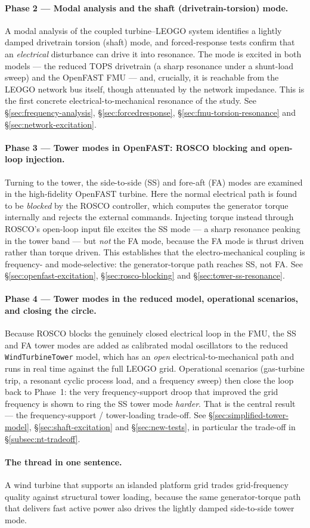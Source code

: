 \paragraph{Phase 2 --- Modal analysis and the shaft (drivetrain-torsion) mode.}
A modal analysis of the coupled turbine--LEOGO system identifies a lightly damped
drivetrain torsion (shaft) mode, and forced-response tests confirm that an
\emph{electrical} disturbance can drive it into resonance. The mode is excited in
both models --- the reduced TOPS drivetrain (a sharp resonance under a shunt-load
sweep) and the OpenFAST FMU --- and, crucially, it is reachable from the LEOGO
network bus itself, though attenuated by the network impedance. This is the first
concrete electrical-to-mechanical resonance of the study. See
\S\ref{sec:frequency-analysis}, \S\ref{sec:forcedresponse},
\S\ref{sec:fmu-torsion-resonance} and \S\ref{sec:network-excitation}.

\paragraph{Phase 3 --- Tower modes in OpenFAST: ROSCO blocking and open-loop
injection.}
Turning to the tower, the side-to-side (SS) and fore-aft (FA) modes are examined
in the high-fidelity OpenFAST turbine. Here the normal electrical path is found
to be \emph{blocked} by the ROSCO controller, which computes the generator torque
internally and rejects the external commands. Injecting torque instead through
ROSCO's open-loop input file excites the SS mode --- a sharp resonance peaking in
the tower band --- but \emph{not} the FA mode, because the FA mode is thrust
driven rather than torque driven. This establishes that the electro-mechanical
coupling is frequency- and mode-selective: the generator-torque path reaches SS,
not FA. See \S\ref{sec:openfast-excitation}, \S\ref{sec:rosco-blocking} and
\S\ref{sec:tower-ss-resonance}.

\paragraph{Phase 4 --- Tower modes in the reduced model, operational scenarios,
and closing the circle.}
Because ROSCO blocks the genuinely closed electrical loop in the FMU, the SS and
FA tower modes are added as calibrated modal oscillators to the reduced
\texttt{WindTurbineTower} model, which has an \emph{open} electrical-to-mechanical
path and runs in real time against the full LEOGO grid. Operational scenarios
(gas-turbine trip, a resonant cyclic process load, and a frequency sweep) then
close the loop back to Phase~1: the very frequency-support droop that improved the
grid frequency is shown to ring the SS tower mode \emph{harder}. That is the
central result --- the frequency-support / tower-loading trade-off. See
\S\ref{sec:simplified-tower-model}, \S\ref{sec:shaft-excitation} and
\S\ref{sec:new-tests}, in particular the trade-off in \S\ref{subsec:nt-tradeoff}.

\paragraph{The thread in one sentence.}
A wind turbine that supports an islanded platform grid trades grid-frequency
quality against structural tower loading, because the same generator-torque path
that delivers fast active power also drives the lightly damped side-to-side tower
mode.
